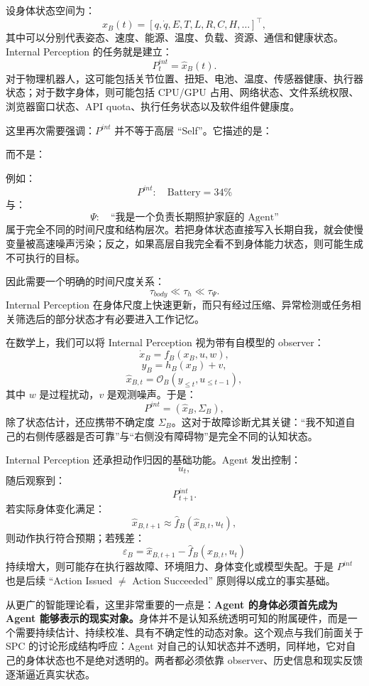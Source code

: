 设身体状态空间为：
\[
x_B(t)
=
[
q,
\dot q,
E,
T,
L,
R,
C,
H,\ldots
]^\top,
\]
其中可以分别代表姿态、速度、能源、温度、负载、资源、通信和健康状态。Internal Perception 的任务就是建立：
\[
P_t^{int}
=
\hat{x}_B(t).
\]
对于物理机器人，这可能包括关节位置、扭矩、电池、温度、传感器健康、执行器状态；对于数字身体，则可能包括 CPU/GPU 占用、网络状态、文件系统权限、浏览器窗口状态、API quota、执行任务状态以及软件组件健康度。

这里再次需要强调：$P^{int}$ 并不等于高层 ``Self''。它描述的是：
\begin{statementbox}
\centering
{}
\end{statementbox}
而不是：
\begin{statementbox}
\centering
{}
\end{statementbox}
例如：
\[
P^{int}:
\quad
\mathrm{Battery}=34\%
\]
与：
\[
\Psi:
\quad
\text{``我是一个负责长期照护家庭的 Agent''}
\]
属于完全不同的时间尺度和结构层次。若把身体状态直接写入长期自我，就会使慢变量被高速噪声污染；反之，如果高层自我完全看不到身体能力状态，则可能生成不可执行的目标。

因此需要一个明确的时间尺度关系：
\[
\tau_{body}
\ll
\tau_h
\ll
\tau_\Psi.
\]
Internal Perception 在身体尺度上快速更新，而只有经过压缩、异常检测或任务相关筛选后的部分状态才有必要进入工作记忆。

在数学上，我们可以将 Internal Perception 视为带有自模型的 observer：
\[
\dot{x}_B
=
f_B(x_B,u,w),
\]
\[
y_B
=
h_B(x_B)+v,
\]
\[
\hat{x}_{B,t}
=
\mathcal O_B(
y_{\leq t},
u_{\leq t-1}
),
\]
其中 $w$ 是过程扰动，$v$ 是观测噪声。于是：
\[
P^{int}
=
(\hat{x}_B,\Sigma_B),
\]
除了状态估计，还应携带不确定度 $\Sigma_B$。这对于故障诊断尤其关键：``我不知道自己的右侧传感器是否可靠''与``右侧没有障碍物''是完全不同的认知状态。

Internal Perception 还承担动作归因的基础功能。Agent 发出控制：
\[
u_t,
\]
随后观察到：
\[
P_{t+1}^{int}.
\]
若实际身体变化满足：
\[
\hat{x}_{B,t+1}
\approx
\hat{f}_B(
\hat{x}_{B,t},u_t
),
\]
则动作执行符合预期；若残差：
\[
\varepsilon_B
=
\hat{x}_{B,t+1}
-
\hat{f}_B(
\hat{x}_{B,t},u_t
)
\]
持续增大，则可能存在执行器故障、环境阻力、身体变化或模型失配。于是 $P^{int}$ 也是后续 ``Action Issued $\neq$ Action Succeeded'' 原则得以成立的事实基础。

从更广的智能理论看，这里非常重要的一点是：\textbf{Agent 的身体必须首先成为 Agent 能够表示的现实对象。}身体并不是认知系统透明可知的附属硬件，而是一个需要持续估计、持续校准、具有不确定性的动态对象。这个观点与我们前面关于 SPC 的讨论形成结构呼应：Agent 对自己的认知状态并不透明，同样地，它对自己的身体状态也不是绝对透明的。两者都必须依靠 observer、历史信息和现实反馈逐渐逼近真实状态。

